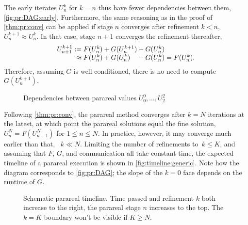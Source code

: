 The early iterates $U_n^k$ for $k=n$ thus have fewer dependencies between them,
\cf \autoref{fig:pr:DAG:early}.
Furthermore, the same reasoning as in the proof of \autoref{thm:pr:conv} can
be applied if stage $n$ converges after refinement $k < n$,
\ie $U^{k+1}_n \approx U^k_n$.
In that case, stage $n+1$ converges the refinement thereafter,
\begin{equation}
  \begin{array}{r@{}l@{}l@{}l}
    U^{k+1}_{n+1}
    :={}      & F(U^k_n) &{}+ G(U^{k+1}_n) &{}- G(U^k_n) \\
    \approx{} & F(U^k_n) &{}+ G(U^k_n)     &{}- G(U^k_n)
    = F(U^k_n)
    .
  \end{array}
\end{equation}
Therefore,
assuming $G$ is well conditioned,
there is no need to compute $G(U^{k+1}_n)$.

\begin{figure}[t]
  \centering
  
  \caption{Dependencies between parareal values $U^0_0, \ldots, U_2^2$}
  \label{fig:pr:DAG:early}
\end{figure}

\pagebreak

Following \autoref{thm:pr:conv},
the parareal method converges after $k=N$ iterations at the latest,
at which point the parareal solutions equal the fine solution,
$U_n^N = F(U_{n-1}^N)$ for $1\leq n \leq N$.
In practice, however, it may converge much earlier than that,
\ie~$k\ll N$.
Limiting the number of refinements to~$k\leq K$,
and assuming that $F$, $G$, and communication all take constant time,
the expected timeline of a parareal execution is shown in \autoref{fig:timeline:generic}.
Note how the diagram corresponds to \autoref{fig:pr:DAG};
the slope of the $k=0$ face depends on the runtime of $G$.

\begin{figure}[b]
  \centering
  
  \caption[Schematic parareal timeline]{%
    Schematic parareal timeline.
    Time passed and refinement $k$ both increase to the right,
    the parareal stage $n$ increases to the top.
    The $k=K$ boundary won't be visible if $K\geq N$.
  }
  \label{fig:timeline:generic}
\end{figure}

\pagebreak

